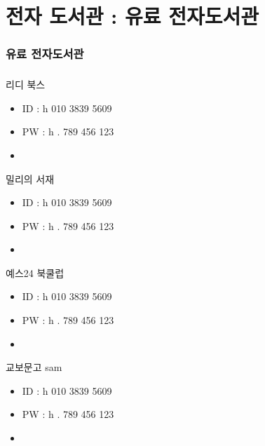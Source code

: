 \documentclass[aspectratio=1610,17pt,xcolor=pdftex,dvipsnames,table,handout]{beamer}
\begin{document}
		\section 	{전자 도서관 : 유료 전자도서관}

		\begin{frame} [t,plain]
		\frametitle{유료 전자도서관}

		\end{frame}						



		\begin{frame} [t,plain]
		\frametitle{}

			\begin{block} {리디 북스}
			\setlength{\leftmargini}{4em}			
			\begin{itemize}
				\item ID : h 010 3839 5609
				\item PW : h . 789 456 123
				\item 
			\end{itemize}
			\end{block}						

			\begin{block} {밀리의 서재}
			\setlength{\leftmargini}{4em}			
			\begin{itemize}
				\item ID : h 010 3839 5609
				\item PW : h . 789 456 123
				\item 
			\end{itemize}
			\end{block}						

			\begin{block} {예스24 북쿨럽}
			\setlength{\leftmargini}{4em}			
			\begin{itemize}
				\item ID : h 010 3839 5609
				\item PW : h . 789 456 123
				\item 
			\end{itemize}
			\end{block}						

			\begin{block} {교보문고 sam}
			\setlength{\leftmargini}{4em}			
			\begin{itemize}
				\item ID : h 010 3839 5609
				\item PW : h . 789 456 123
				\item 
			\end{itemize}
			\end{block}						

		\end{frame}						
\end{document}
